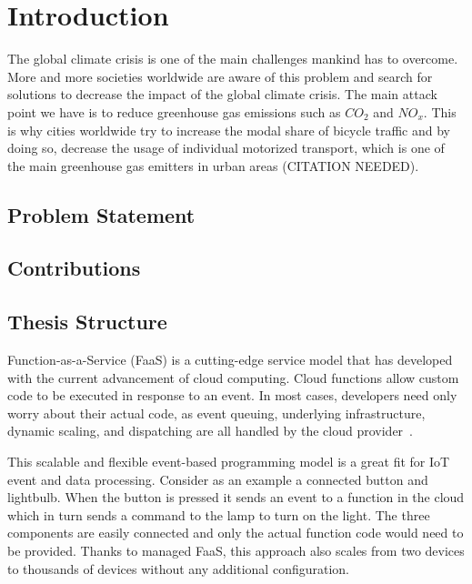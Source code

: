 \cleardoublepage
\chapter{Introduction}
\label{cha:introduction}
The global climate crisis is one of the main challenges mankind has to overcome.
More and more societies worldwide are aware of this problem and search for solutions to decrease the impact of the global climate crisis.
The main attack point we have is to reduce greenhouse gas emissions such as $CO_{2}$ and $NO_{x}$.
This is why cities worldwide try to increase the modal share of bicycle traffic and by doing so, decrease the usage of individual motorized transport, which is one of the main greenhouse gas emitters in urban areas (CITATION NEEDED).


\section{Problem Statement}
\label{sec:problem}

\section{Contributions}
\label{sec:contributions}

\section{Thesis Structure}
\label{sec:structure}

Function-as-a-Service (FaaS) is a cutting-edge service model that has developed with the current advancement of cloud computing.
Cloud functions allow custom code to be executed in response to an event.
In most cases, developers need only worry about their actual code, as event queuing, underlying infrastructure, dynamic scaling, and dispatching are all handled by the cloud provider~\cite{Baldini2017-zf,McGrath2017-or}.

This scalable and flexible event-based programming model is a great fit for IoT event and data processing.
Consider as an example a connected button and lightbulb.
When the button is pressed it sends an event to a function in the cloud which in turn sends a command to the lamp to turn on the light.
The three components are easily connected and only the actual function code would need to be provided.
Thanks to managed FaaS, this approach also scales from two devices to thousands of devices without any additional configuration.

